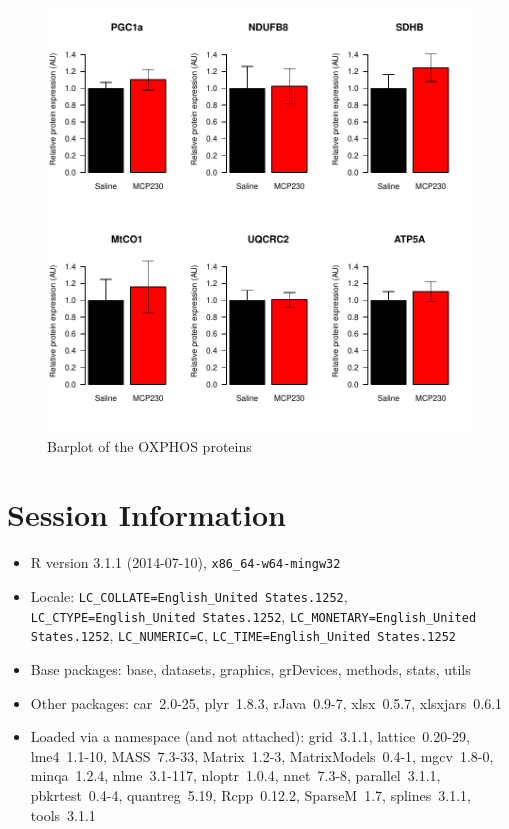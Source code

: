 \documentclass{article}
\begin{document}
\begin{figure}
\begin{center}
\includegraphics{2016-01-21_MitochondrialProteins-barplot-combined}
\end{center}
\caption{Barplot of the OXPHOS proteins}
\label{fig:barplot-combined}
\end{figure}

\section*{Session Information}
\begin{itemize}\raggedright
  \item R version 3.1.1 (2014-07-10), \verb|x86_64-w64-mingw32|
  \item Locale: \verb|LC_COLLATE=English_United States.1252|, \verb|LC_CTYPE=English_United States.1252|, \verb|LC_MONETARY=English_United States.1252|, \verb|LC_NUMERIC=C|, \verb|LC_TIME=English_United States.1252|
  \item Base packages: base, datasets, graphics, grDevices, methods,
    stats, utils
  \item Other packages: car~2.0-25, plyr~1.8.3, rJava~0.9-7,
    xlsx~0.5.7, xlsxjars~0.6.1
  \item Loaded via a namespace (and not attached): grid~3.1.1,
    lattice~0.20-29, lme4~1.1-10, MASS~7.3-33, Matrix~1.2-3,
    MatrixModels~0.4-1, mgcv~1.8-0, minqa~1.2.4, nlme~3.1-117,
    nloptr~1.0.4, nnet~7.3-8, parallel~3.1.1, pbkrtest~0.4-4,
    quantreg~5.19, Rcpp~0.12.2, SparseM~1.7, splines~3.1.1, tools~3.1.1
\end{itemize}
\end{document}

